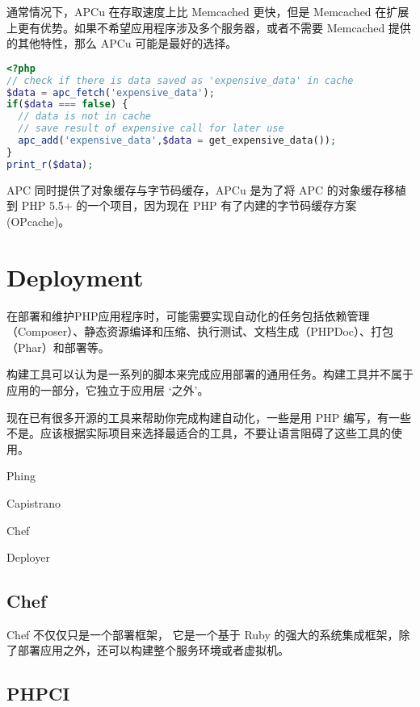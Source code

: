 通常情况下，APCu 在存取速度上比 Memcached 更快，但是 Memcached 在扩展上更有优势。如果不希望应用程序涉及多个服务器，或者不需要 Memcached 提供的其他特性，那么 APCu 可能是最好的选择。

\begin{lstlisting}[language=PHP]
<?php
// check if there is data saved as 'expensive_data' in cache
$data = apc_fetch('expensive_data');
if($data === false) {
  // data is not in cache
  // save result of expensive call for later use
  apc_add('expensive_data',$data = get_expensive_data());
}
print_r($data);
\end{lstlisting}

APC 同时提供了对象缓存与字节码缓存，APCu 是为了将 APC 的对象缓存移植到 PHP 5.5+ 的一个项目，因为现在 PHP 有了内建的字节码缓存方案 (OPcache)。





\chapter{Deployment}


在部署和维护PHP应用程序时，可能需要实现自动化的任务包括依赖管理（Composer）、静态资源编译和压缩、执行测试、文档生成（PHPDoc）、打包（Phar）和部署等。




构建工具可以认为是一系列的脚本来完成应用部署的通用任务。构建工具并不属于应用的一部分，它独立于应用层 ‘之外’。

现在已有很多开源的工具来帮助你完成构建自动化，一些是用 PHP 编写，有一些不是。应该根据实际项目来选择最适合的工具，不要让语言阻碍了这些工具的使用。

\begin{compactitem}
\item Phing
\item Capistrano
\item Chef
\item Deployer
\end{compactitem}


\section{Chef}


Chef 不仅仅只是一个部署框架， 它是一个基于 Ruby 的强大的系统集成框架，除了部署应用之外，还可以构建整个服务环境或者虚拟机。

\section{PHPCI}


